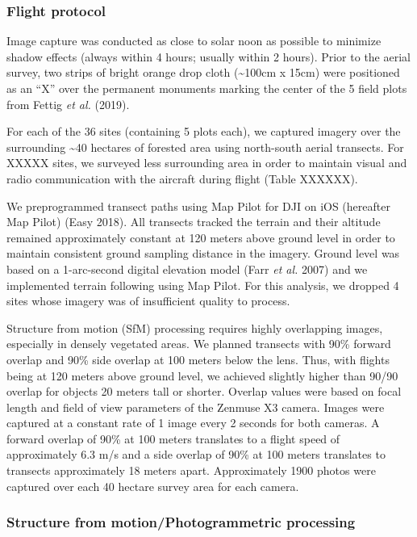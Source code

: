 \documentclass[]{article}
\begin{document}
\subsubsection{Flight protocol}\label{flight-protocol}

Image capture was conducted as close to solar noon as possible to
minimize shadow effects (always within 4 hours; usually within 2 hours).
Prior to the aerial survey, two strips of bright orange drop cloth
(\textasciitilde{}100cm x 15cm) were positioned as an ``X'' over the
permanent monuments marking the center of the 5 field plots from Fettig
\emph{et al.} (2019).

For each of the 36 sites (containing 5 plots each), we captured imagery
over the surrounding \textasciitilde{}40 hectares of forested area using
north-south aerial transects. For XXXXX sites, we surveyed less
surrounding area in order to maintain visual and radio communication
with the aircraft during flight (Table XXXXXX).

We preprogrammed transect paths using Map Pilot for DJI on iOS
(hereafter Map Pilot) (Easy 2018). All transects tracked the terrain and
their altitude remained approximately constant at 120 meters above
ground level in order to maintain consistent ground sampling distance in
the imagery. Ground level was based on a 1-arc-second digital elevation
model (Farr \emph{et al.} 2007) and we implemented terrain following
using Map Pilot. For this analysis, we dropped 4 sites whose imagery was
of insufficient quality to process.

Structure from motion (SfM) processing requires highly overlapping
images, especially in densely vegetated areas. We planned transects with
90\% forward overlap and 90\% side overlap at 100 meters below the lens.
Thus, with flights being at 120 meters above ground level, we achieved
slightly higher than 90/90 overlap for objects 20 meters tall or
shorter. Overlap values were based on focal length and field of view
parameters of the Zenmuse X3 camera. Images were captured at a constant
rate of 1 image every 2 seconds for both cameras. A forward overlap of
90\% at 100 meters translates to a flight speed of approximately 6.3 m/s
and a side overlap of 90\% at 100 meters translates to transects
approximately 18 meters apart. Approximately 1900 photos were captured
over each 40 hectare survey area for each camera.

\subsubsection{Structure from motion/Photogrammetric
processing}\label{structure-from-motionphotogrammetric-processing}
\end{document}
